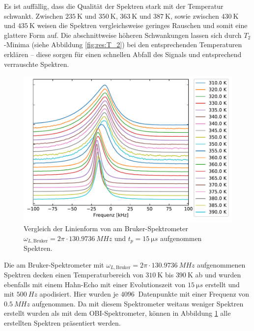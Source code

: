 Es ist auffällig, dass die Qualität der Spektren stark mit der Temperatur schwankt. Zwischen $\SI{235}{\kelvin}$ und $\SI{350}{\kelvin}$, $\SI{363}{\kelvin}$ und $\SI{387}{\kelvin}$, sowie zwischen $\SI{430}{\kelvin}$ und $\SI{435}{\kelvin}$ weisen die Spektren vergleichsweise geringes Rauschen und somit eine glattere Form auf. Die abschnittweise höheren Schwankungen lassen sich durch $T_2$-Minima (siehe Abbildung \ref{fig:res:T_2}) bei den entsprechenden Temperaturen erklären -- diese sorgen für einen schnellen Abfall des Signals und entsprechend verrauschte Spektren.

\begin{figure}
	\begin{center}
		\includegraphics[width=\textwidth]{graphics/plot/bruker_lineshape.pdf}
	\end{center}
	\caption{Vergleich der Linienform von am Bruker-Spektrometer $\omega_{L, \text{Bruker}} = 2\pi \cdot \SI{130.9736}{MHz}$ und $t_p = \SI{15}{\micro s}$ aufgenommen Spektren.} \label{fig:res:bruker_linienform}
\end{figure}
Die am Bruker-Spektrometer mit $\omega_{L, \text{Bruker}} = 2\pi \cdot \SI{130.9736}{MHz}$ aufgenommenen Spektren decken einen Temperaturbereich von $\SI{310}{\kelvin}$ bis $\SI{390}{\kelvin}$ ab und wurden ebenfalls mit einem Hahn-Echo mit einer Evolutionszeit von $\SI{15}{\micro s}$ erstellt und mit $\SI{500}{Hz}$ apodisiert. Hier wurden je $\SI{4096}{}$ Datenpunkte mit einer Frequenz von $\SI{0.5}{MHz}$ aufgenommen. Da mit diesem Spektrometer weitaus weniger Spektren erstellt wurden als mit dem OBI-Spektrometer, können in Abbildung \ref{fig:res:bruker_linienform} alle erstellten Spektren präsentiert werden.

